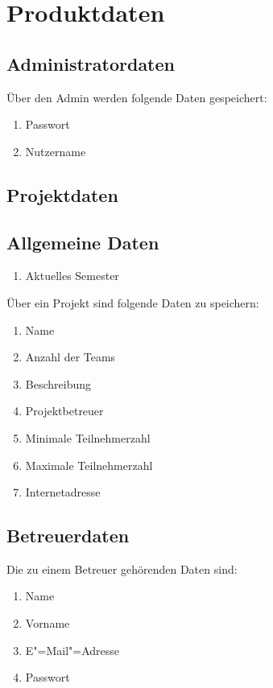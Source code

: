 \documentclass[parskip=full]{scrartcl}
\newcommand{\swtLabel}[1]{\textbf{/#1\arabic*0/}}
\begin{document}
\section{Produktdaten}

\subsection{Administratordaten}
Über den \gls{Admin} werden folgende Daten gespeichert:
\begin{enumerate}[label=\swtLabel{D}] 
	\item Passwort
	\item Nutzername
\end{enumerate}

\subsection{Projektdaten} 
\subsection{Allgemeine Daten}
\begin{enumerate}[label=\swtLabel{D},resume]
  \item Aktuelles Semester
\end{enumerate}

Über ein Projekt sind folgende Daten zu speichern:
\begin{enumerate}[label=\swtLabel{D},resume] 
  \item Name
  \item Anzahl der Teams
  \item Beschreibung
  \item Projektbetreuer
  \item Minimale Teilnehmerzahl
  \item Maximale Teilnehmerzahl
  \item Internetadresse
\end{enumerate}

\subsection{Betreuerdaten}
Die zu einem Betreuer gehörenden Daten sind:
\begin{enumerate}[label=\swtLabel{D}, resume] 
	\item Name
	\item Vorname
	\item E"=Mail"=Adresse
	\item Passwort
\end{enumerate}
\end{document}
